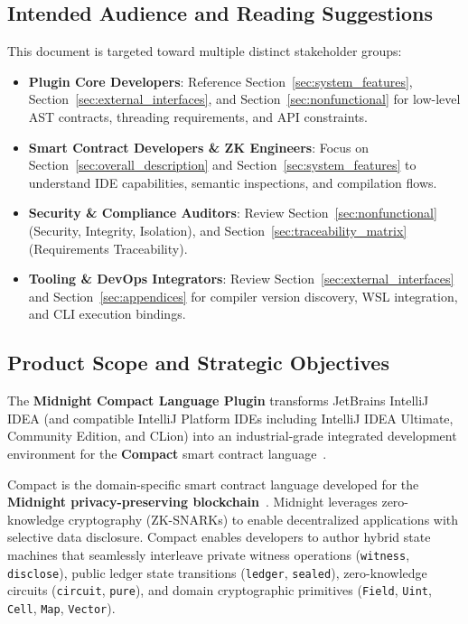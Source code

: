 \subsection{Intended Audience and Reading Suggestions}
This document is targeted toward multiple distinct stakeholder groups:
\begin{itemize}
    \item \textbf{Plugin Core Developers}: Reference Section~\ref{sec:system_features}, Section~\ref{sec:external_interfaces}, and Section~\ref{sec:nonfunctional} for low-level AST contracts, threading requirements, and API constraints.
    \item \textbf{Smart Contract Developers \& ZK Engineers}: Focus on Section~\ref{sec:overall_description} and Section~\ref{sec:system_features} to understand IDE capabilities, semantic inspections, and compilation flows.
    \item \textbf{Security \& Compliance Auditors}: Review Section~\ref{sec:nonfunctional} (Security, Integrity, Isolation), and Section~\ref{sec:traceability_matrix} (Requirements Traceability).
    \item \textbf{Tooling \& DevOps Integrators}: Review Section~\ref{sec:external_interfaces} and Section~\ref{sec:appendices} for compiler version discovery, WSL integration, and CLI execution bindings.
\end{itemize}

\subsection{Product Scope and Strategic Objectives}
The \textbf{Midnight Compact Language Plugin} transforms JetBrains IntelliJ IDEA (and compatible IntelliJ Platform IDEs including IntelliJ IDEA Ultimate, Community Edition, and CLion) into an industrial-grade integrated development environment for the \textbf{Compact} smart contract language~\cite{compactSpec}. 

Compact is the domain-specific smart contract language developed for the \textbf{Midnight privacy-preserving blockchain}~\cite{midnightWhitepaper}. Midnight leverages zero-knowledge cryptography (ZK-SNARKs) to enable decentralized applications with selective data disclosure. Compact enables developers to author hybrid state machines that seamlessly interleave private witness operations (\texttt{witness}, \texttt{disclose}), public ledger state transitions (\texttt{ledger}, \texttt{sealed}), zero-knowledge circuits (\texttt{circuit}, \texttt{pure}), and domain cryptographic primitives (\texttt{Field}, \texttt{Uint}, \texttt{Cell}, \texttt{Map}, \texttt{Vector}).

